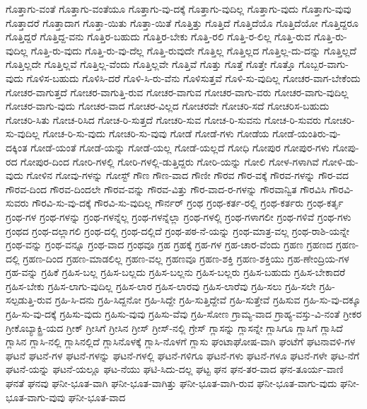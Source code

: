 {ಗೊತ್ತಾಗು-ವಂತೆ
ಗೊತ್ತಾಗು-ವಂತೆಯೂ
ಗೊತ್ತಾಗು-ವು-ದಕ್ಕೆ
ಗೊತ್ತಾಗು-ವುದಿಲ್ಲ
ಗೊತ್ತಾಗು-ವುದು
ಗೊತ್ತಾಗು-ವುವು
ಗೊತ್ತಾದರೆ
ಗೊತ್ತಾದಾಗ
ಗೊತ್ತಾ-ಯಿತು
ಗೊತ್ತಾ-ಯಿತೆ
ಗೊತ್ತಿತ್ತು
ಗೊತ್ತಿದೆ
ಗೊತ್ತಿದೆಯೊ
ಗೊತ್ತಿದೆಯೋ
ಗೊತ್ತಿದ್ದರೂ
ಗೊತ್ತಿದ್ದರೆ
ಗೊತ್ತಿದ್ದ-ವನು
ಗೊತ್ತಿರ-ಬಹುದು
ಗೊತ್ತಿರ-ಬೇಕು
ಗೊತ್ತಿ-ರಲಿ
ಗೊತ್ತಿ-ರ-ಲಿಲ್ಲ
ಗೊತ್ತಿ-ರುವ
ಗೊತ್ತಿ-ರು-ವುದಿಲ್ಲ
ಗೊತ್ತಿ-ರು-ವುದು
ಗೊತ್ತಿ-ರು-ವು-ದೆಲ್ಲ
ಗೊತ್ತಿ-ರುವುದೇ
ಗೊತ್ತಿಲ್ಲ
ಗೊತ್ತಿಲ್ಲದ
ಗೊತ್ತಿಲ್ಲ-ದು-ದನ್ನು
ಗೊತ್ತಿಲ್ಲದೆ
ಗೊತ್ತಿಲ್ಲದೇ
ಗೊತ್ತಿಲ್ಲವೆ
ಗೊತ್ತಿಲ್ಲ-ವೆಂದು
ಗೊತ್ತಿಲ್ಲವೇ
ಗೊತ್ತಿವೆ
ಗೊತ್ತು
ಗೊತ್ತೆ
ಗೊತ್ತೇ
ಗೊತ್ತೊ
ಗೊಬ್ಬರ-ವಾಗು-ವುದು
ಗೊಳಿಸ-ಬಹುದು
ಗೊಳಿಸಿ-ದರೆ
ಗೊಳಿ-ಸಿ-ರು-ವೆನು
ಗೊಳಿಸುತ್ತವೆ
ಗೊಳಿ-ಸು-ವುದಿಲ್ಲ
ಗೋಚರ-ವಾಗ-ಬೇಕೆಂದು
ಗೋಚರ-ವಾಗುತ್ತದೆ
ಗೋಚರ-ವಾಗುತ್ತಿ-ರುವ
ಗೋಚರ-ವಾಗುವ
ಗೋಚರ-ವಾಗು-ವರು
ಗೋಚರ-ವಾಗು-ವುದಿಲ್ಲ
ಗೋಚರ-ವಾಗು-ವುದು
ಗೋಚರ-ವಾದ
ಗೋಚರ-ವಿಲ್ಲದ
ಗೋಚರವೇ
ಗೋಚರಿ-ಸದೆ
ಗೋಚರಿಸ-ಬಹುದು
ಗೋಚರಿ-ಸಿತು
ಗೋಚ-ರಿಸಿದ
ಗೋಚ-ರಿ-ಸುತ್ತದೆ
ಗೋಚರಿ-ಸುವ
ಗೋಚ-ರಿ-ಸುವನು
ಗೋಚ-ರಿ-ಸುವರು
ಗೋಚರಿ-ಸು-ವುದಿಲ್ಲ
ಗೋಚ-ರಿ-ಸು-ವುದು
ಗೋಚರಿ-ಸು-ವುವು
ಗೋಡೆ
ಗೋಡೆ-ಗಳು
ಗೋಡೆಯ
ಗೋಡೆ-ಯಂತಿರು-ವು-ದಕ್ಕಿಂತ
ಗೋಡೆ-ಯಂತೆ
ಗೋಡೆ-ಯನ್ನು
ಗೋಡೆ-ಯಲ್ಲ
ಗೋಡೆ-ಯಲ್ಲದೆ
ಗೋಧಿ
ಗೋಪುರ
ಗೋಪುರ-ಗಳು
ಗೋಪು-ರದ
ಗೋಪುರ-ದಿಂದ
ಗೋರಿ-ಗಳಲ್ಲಿ
ಗೋರಿ-ಗಳಲ್ಲಿ-ಡುತ್ತಿದ್ದರು
ಗೋರಿ-ಯನ್ನು
ಗೋಲಿ
ಗೋಳ-ಗಳಾಗಿವೆ
ಗೋಳಿ-ಡು-ವುದು
ಗೋಳಿನ
ಗೋವು-ಗಳನ್ನು
ಗೋಸ್ಟ್
ಗೌಣ
ಗೌಣ-ವಾದ
ಗೌಣೀ
ಗೌರವ
ಗೌರ-ವಕ್ಕೆ
ಗೌರವ-ಗಳನ್ನು
ಗೌರ-ವದ
ಗೌರವ-ದಿಂದ
ಗೌರವ-ದಿಂದಲೇ
ಗೌರವ-ವನ್ನು
ಗೌರವ-ವಿತ್ತು
ಗೌರ-ವಾದ-ರ-ಗಳನ್ನು
ಗೌರವಾನ್ವಿತ
ಗೌರವಿಸಿ
ಗೌರವಿ-ಸುವರು
ಗೌರವಿ-ಸು-ವು-ದಕ್ಕೆ
ಗೌರವಿ-ಸು-ವುದಿಲ್ಲ
ಗೌರ್ನರ್
ಗ್ರಂಥ
ಗ್ರಂಥ-ಕರ್ತ-ರಲ್ಲಿ
ಗ್ರಂಥ-ಕರ್ತರು
ಗ್ರಂಥ-ಕರ್ತೃ
ಗ್ರಂಥ-ಗಳ
ಗ್ರಂಥ-ಗಳನ್ನು
ಗ್ರಂಥ-ಗಳನ್ನೆಲ್ಲ
ಗ್ರಂಥ-ಗಳನ್ನೆಲ್ಲಾ
ಗ್ರಂಥ-ಗಳಲ್ಲಿ
ಗ್ರಂಥ-ಗಳಾಗಲೀ
ಗ್ರಂಥ-ಗಳಿವೆ
ಗ್ರಂಥ-ಗಳು
ಗ್ರಂಥದ
ಗ್ರಂಥ-ದಲ್ಲಾಗಲಿ
ಗ್ರಂಥ-ದಲ್ಲಿ
ಗ್ರಂಥ-ದಲ್ಲಿದೆ
ಗ್ರಂಥ-ಪಠ-ನೆ-ಯನ್ನು
ಗ್ರಂಥ-ಮಾತ್ರ-ವಲ್ಲ
ಗ್ರಂಥ-ರಾಶಿ-ಯನ್ನೇ
ಗ್ರಂಥ-ವನ್ನು
ಗ್ರಂಥ-ವನ್ನೂ
ಗ್ರಂಥ-ವಾದ
ಗ್ರಂಥವೂ
ಗ್ರಹ
ಗ್ರಹಕ್ಕೆ
ಗ್ರಹ-ಗಳ
ಗ್ರಹ-ಚಾರ-ವೆಂದು
ಗ್ರಹಣ
ಗ್ರಹಣದ
ಗ್ರಹಣ-ದಲ್ಲಿ
ಗ್ರಹಣ-ದಿಂದ
ಗ್ರಹಣ-ಮಾಡಲಿಲ್ಲ
ಗ್ರಹಣ-ವಲ್ಲ
ಗ್ರಹಣವೂ
ಗ್ರಹಣ-ಶಕ್ತಿ
ಗ್ರಹಣ-ಶಕ್ತಿಯು
ಗ್ರಹ-ಣೇಂದ್ರಿಯ-ಗಳ
ಗ್ರಹ-ವನ್ನು
ಗ್ರಹಿಕೆ
ಗ್ರಹಿಸ-ಬಲ್ಲ
ಗ್ರಹಿಸ-ಬಲ್ಲದು
ಗ್ರಹಿಸ-ಬಲ್ಲನು
ಗ್ರಹಿಸ-ಬಲ್ಲರು
ಗ್ರಹಿಸ-ಬಹುದು
ಗ್ರಹಿಸ-ಬೇಕಾದರೆ
ಗ್ರಹಿಸ-ಬೇಕು
ಗ್ರಹಿಸ-ಲಾಗು-ವುದಿಲ್ಲ
ಗ್ರಹಿಸ-ಲಾರ
ಗ್ರಹಿಸ-ಲಾರವು
ಗ್ರಹಿಸ-ಲಾರೆವು
ಗ್ರಹಿ-ಸಲು
ಗ್ರಹಿ-ಸಲೇ
ಗ್ರಹಿ-ಸಲ್ಪಡುತ್ತಿ-ರುವ
ಗ್ರಹಿ-ಸಿ-ದನು
ಗ್ರಹಿ-ಸಿದ್ದನೋ
ಗ್ರಹಿ-ಸಿದ್ದೇ
ಗ್ರಹಿ-ಸುತ್ತಿದ್ದೇವೆ
ಗ್ರಹಿ-ಸುತ್ತೇವೆ
ಗ್ರಹಿಸುವ
ಗ್ರಹಿ-ಸು-ವು-ದಕ್ಕೂ
ಗ್ರಹಿ-ಸು-ವು-ದಕ್ಕೆ
ಗ್ರಹಿಸು-ವುದು
ಗ್ರಹಿಸು-ವುವು
ಗ್ರಹಿಸು-ವೆವು
ಗ್ರಹಿ-ಸೋಣ
ಗ್ರಾಮ್ಯ-ವಾದ
ಗ್ರಾಹ್ಯ-ವಸ್ತು-ವಿ-ನಂತೆ
ಗ್ರೀಕರ
ಗ್ರೀಕೊಬ್ಯಾಕ್ಟ್ರಿ-ಯದ
ಗ್ರೀಕ್
ಗ್ರೀಸಿಗೆ
ಗ್ರೀಸಿನ
ಗ್ರೀಸ್
ಗ್ರೀಸ್-ನಲ್ಲಿ
ಗ್ರೇಸ್
ಗ್ಲಾಸನ್ನು
ಗ್ಲಾಸನ್ನೇ
ಗ್ಲಾಸಿಗೂ
ಗ್ಲಾಸಿಗೆ
ಗ್ಲಾಸಿದೆ
ಗ್ಲಾಸಿನ
ಗ್ಲಾಸಿ-ನಲ್ಲಿ
ಗ್ಲಾಸಿನಲ್ಲಿದೆ
ಗ್ಲಾಸಿನೊಳಕ್ಕೆ
ಗ್ಲಾಸಿ-ನೊಳಗೆ
ಗ್ಲಾಸು
ಘಂಟಾಘೋಷ-ವಾಗಿ
ಘಂಟೆಗೆ
ಘಟನಾವಳಿ-ಗಳ
ಘಟನೆ
ಘಟನೆ-ಗಳ
ಘಟನೆ-ಗಳನ್ನು
ಘಟನೆ-ಗಳಲ್ಲಿ
ಘಟನೆ-ಗಳಿಗೂ
ಘಟನೆ-ಗಳು
ಘಟನೆ-ಗಳೂ
ಘಟನೆ-ಗಳೇ
ಘಟ-ನೆಗೆ
ಘಟನೆ-ಯನ್ನು
ಘಟನೆ-ಯಲ್ಲೂ
ಘಟ-ನೆಯು
ಘಟಿ-ಸಿದು-ದಲ್ಲ
ಘಟ್ಟ
ಘನ
ಘನ-ತರ-ವಾದ
ಘನ-ತೂರ್ಯ-ವಾಣಿ
ಘನತೆ
ಘನವು
ಘನೀ-ಭೂತ-ವಾಗಿ
ಘನೀ-ಭೂತ-ವಾಗಿತ್ತು
ಘನೀ-ಭೂತ-ವಾಗಿ-ರುವ
ಘನೀ-ಭೂತ-ವಾಗು-ವುದು
ಘನೀ-ಭೂತ-ವಾಗು-ವುವು
ಘನೀ-ಭೂತ-ವಾದ
}
